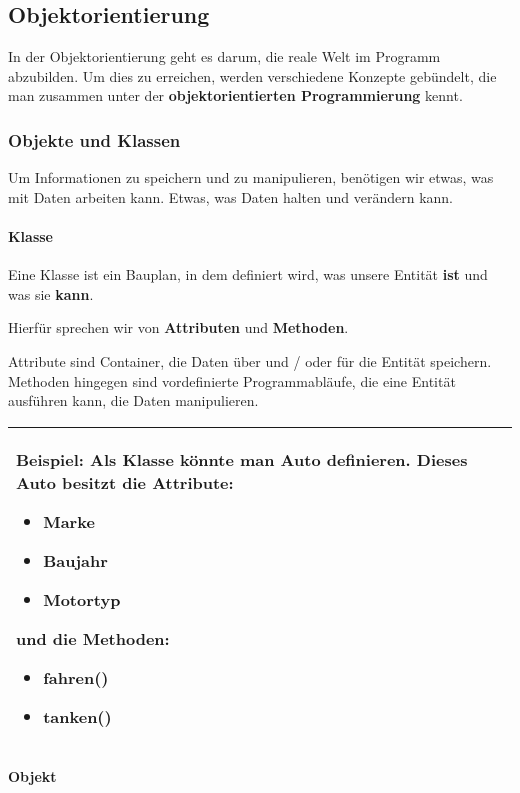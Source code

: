 \subsection{Objektorientierung}
\label{sec:Objektorientierung}

In der Objektorientierung geht es darum, die reale Welt im Programm abzubilden. Um dies zu erreichen, werden verschiedene Konzepte gebündelt, die man zusammen unter der \textbf{objektorientierten Programmierung} kennt.

\subsubsection{Objekte und Klassen}

Um Informationen zu speichern und zu manipulieren, benötigen wir etwas, was mit Daten arbeiten kann. Etwas, was Daten halten und verändern kann.

\paragraph{Klasse}

Eine Klasse ist ein Bauplan, in dem definiert wird, was unsere Entität \textbf{ist} und was sie \textbf{kann}.

Hierfür sprechen wir von \textbf{Attributen} und \textbf{Methoden}.

Attribute sind Container, die Daten über und / oder für die Entität speichern.
Methoden hingegen sind vordefinierte Programmabläufe, die eine Entität ausführen kann, die Daten manipulieren.

\begin{tabular}{|p{\linewidth}|}
	\hline
	Beispiel: Als Klasse könnte man \textbf{Auto} definieren. Dieses Auto besitzt die Attribute:
	\begin{itemize}
		\item Marke
		\item Baujahr
		\item Motortyp
	\end{itemize}
	und die Methoden:
	\begin{itemize}
		\item fahren()
		\item tanken()
	\end{itemize}\\
	\hline
\end{tabular}

\paragraph{Objekt}

